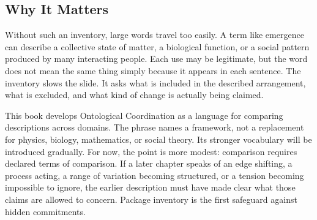 \documentclass[11pt,a4paper,openany]{book}
\begin{document}
\subsection{Why It Matters}
Without such an inventory, large words travel too easily. A term like emergence can describe a collective state of matter, a biological function, or a social pattern produced by many interacting people. Each use may be legitimate, but the word does not mean the same thing simply because it appears in each sentence. The inventory slows the slide. It asks what is included in the described arrangement, what is excluded, and what kind of change is actually being claimed. \cite{goldenfeld_lectures,kadanoff_scaling}\par
This book develops Ontological Coordination as a language for comparing descriptions across domains. The phrase names a framework, not a replacement for physics, biology, mathematics, or social theory. Its stronger vocabulary will be introduced gradually. For now, the point is more modest: comparison requires declared terms of comparison. If a later chapter speaks of an edge shifting, a process acting, a range of variation becoming structured, or a tension becoming impossible to ignore, the earlier description must have made clear what those claims are allowed to concern. Package inventory is the first safeguard against hidden commitments.\par
\end{document}
